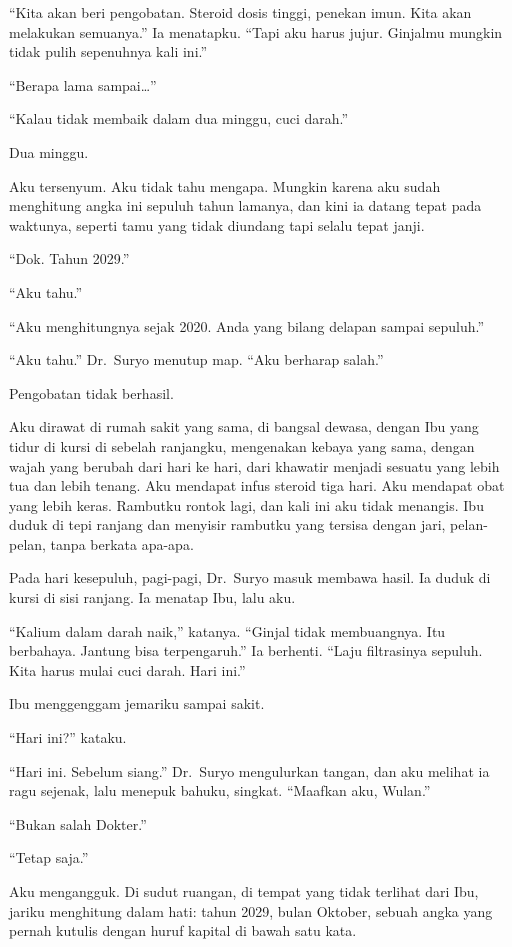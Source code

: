 \documentclass[11pt,twoside,openany]{book}
\makeatletter
\newcommand{\scenebreak}{\par\vspace{0.9em}{\centering\textsc{*\hspace{0.7em}*\hspace{0.7em}*}\par}\vspace{0.9em}\@afterindentfalse\@afterheading}
\makeatother
\begin{document}
``Kita akan beri pengobatan. Steroid dosis tinggi, penekan imun. Kita akan melakukan semuanya.'' Ia menatapku. ``Tapi aku harus jujur. Ginjalmu mungkin tidak pulih sepenuhnya kali ini.''

``Berapa lama sampai\ldots{}''

``Kalau tidak membaik dalam dua minggu, cuci darah.''

Dua minggu.

Aku tersenyum. Aku tidak tahu mengapa. Mungkin karena aku sudah menghitung angka ini sepuluh tahun lamanya, dan kini ia datang tepat pada waktunya, seperti tamu yang tidak diundang tapi selalu tepat janji.

``Dok. Tahun 2029.''

``Aku tahu.''

``Aku menghitungnya sejak 2020. Anda yang bilang delapan sampai sepuluh.''

``Aku tahu.'' Dr.~Suryo menutup map. ``Aku berharap salah.''

\scenebreak
Pengobatan tidak berhasil.

Aku dirawat di rumah sakit yang sama, di bangsal dewasa, dengan Ibu yang tidur di kursi di sebelah ranjangku, mengenakan kebaya yang sama, dengan wajah yang berubah dari hari ke hari, dari khawatir menjadi sesuatu yang lebih tua dan lebih tenang. Aku mendapat infus steroid tiga hari. Aku mendapat obat yang lebih keras. Rambutku rontok lagi, dan kali ini aku tidak menangis. Ibu duduk di tepi ranjang dan menyisir rambutku yang tersisa dengan jari, pelan-pelan, tanpa berkata apa-apa.

Pada hari kesepuluh, pagi-pagi, Dr.~Suryo masuk membawa hasil. Ia duduk di kursi di sisi ranjang. Ia menatap Ibu, lalu aku.

``Kalium dalam darah naik,'' katanya. ``Ginjal tidak membuangnya. Itu berbahaya. Jantung bisa terpengaruh.'' Ia berhenti. ``Laju filtrasinya sepuluh. Kita harus mulai cuci darah. Hari ini.''

Ibu menggenggam jemariku sampai sakit.

``Hari ini?'' kataku.

``Hari ini. Sebelum siang.'' Dr.~Suryo mengulurkan tangan, dan aku melihat ia ragu sejenak, lalu menepuk bahuku, singkat. ``Maafkan aku, Wulan.''

``Bukan salah Dokter.''

``Tetap saja.''

Aku mengangguk. Di sudut ruangan, di tempat yang tidak terlihat dari Ibu, jariku menghitung dalam hati: tahun 2029, bulan Oktober, sebuah angka yang pernah kutulis dengan huruf kapital di bawah satu kata.
\end{document}

